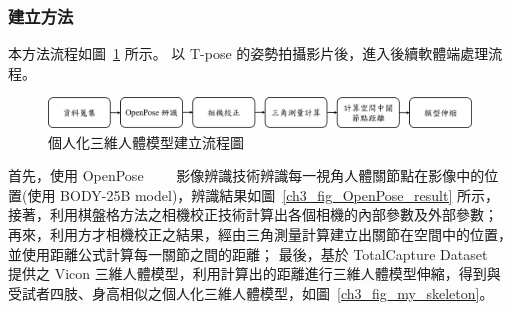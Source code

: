 
\subsubsection{建立方法}
本方法流程如圖~\ref{ch3_fig_skeleton_flow} 所示。
以 T-pose 的姿勢拍攝影片後，進入後續軟體端處理流程。

\begin{figure}[!ht]
   \centering
   \includegraphics[width=\linewidth]{figure/ch3_fig_skeleton_flow.png}
    \caption[個人化三維人體模型建立流程圖]{個人化三維人體模型建立流程圖}
    \label{ch3_fig_skeleton_flow}
\end{figure}

首先，使用 OpenPose~\cite{8765346}~\cite{wei2016cpm}~\cite{simon2017hand}~\cite{cao2017realtime}
影像辨識技術辨識每一視角人體關節點在影像中的位置(使用 BODY-25B model)，辨識結果如圖~\ref{ch3_fig_OpenPose_result} 所示，
接著，利用棋盤格方法之相機校正技術計算出各個相機的內部參數及外部參數；
再來，利用方才相機校正之結果，經由三角測量計算建立出關節在空間中的位置，並使用距離公式計算每一關節之間的距離；
最後，基於 TotalCapture Dataset ~\cite{Trumble:BMVC:2017} 提供之 Vicon 三維人體模型，利用計算出的距離進行三維人體模型伸縮，得到與受試者四肢、身高相似之個人化三維人體模型，如圖~\ref{ch3_fig_my_skeleton}。

